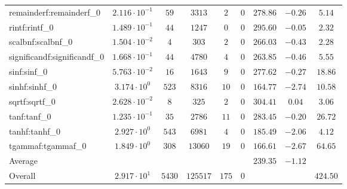 \begin{tabular}{|l|c|c|c|c|c|c|c|c|}
remainderf:remainderf\_0     & $ 2.116 \cdot 10^{-1} $ & $ 59     $ & $ 3313   $ & $ 2   $ & $ 0   $ & $ 278.86      $ & $ -0.26   $ & $ 5.14    $ \\
rintf:rintf\_0               & $ 1.489 \cdot 10^{-1} $ & $ 44     $ & $ 1247   $ & $ 0   $ & $ 0   $ & $ 295.60      $ & $ -0.05   $ & $ 2.32    $ \\
scalbnf:scalbnf\_0           & $ 1.504 \cdot 10^{-2} $ & $ 4      $ & $ 303    $ & $ 2   $ & $ 0   $ & $ 266.03      $ & $ -0.43   $ & $ 2.28    $ \\
significandf:significandf\_0 & $ 1.668 \cdot 10^{-1} $ & $ 44     $ & $ 4780   $ & $ 4   $ & $ 0   $ & $ 263.85      $ & $ -0.46   $ & $ 5.55    $ \\
sinf:sinf\_0                 & $ 5.763 \cdot 10^{-2} $ & $ 16     $ & $ 1643   $ & $ 9   $ & $ 0   $ & $ 277.62      $ & $ -0.27   $ & $ 18.86   $ \\
sinhf:sinhf\_0               & $ 3.174 \cdot 10^{0}  $ & $ 523    $ & $ 8316   $ & $ 10  $ & $ 0   $ & $ 164.77      $ & $ -2.74   $ & $ 10.58   $ \\
sqrtf:sqrtf\_0               & $ 2.628 \cdot 10^{-2} $ & $ 8      $ & $ 325    $ & $ 2   $ & $ 0   $ & $ 304.41      $ & $ 0.04    $ & $ 3.06    $ \\
tanf:tanf\_0                 & $ 1.235 \cdot 10^{-1} $ & $ 35     $ & $ 2786   $ & $ 11  $ & $ 0   $ & $ 283.45      $ & $ -0.20   $ & $ 26.72   $ \\
tanhf:tanhf\_0               & $ 2.927 \cdot 10^{0}  $ & $ 543    $ & $ 6981   $ & $ 4   $ & $ 0   $ & $ 185.49      $ & $ -2.06   $ & $ 4.12    $ \\
tgammaf:tgammaf\_0           & $ 1.849 \cdot 10^{0}  $ & $ 308    $ & $ 13060  $ & $ 19  $ & $ 0   $ & $ 166.61      $ & $ -2.67   $ & $ 64.65   $ \\
\hline
Average                      & $                     $ & $        $ & $        $ & $     $ & $     $ & $ 239.35      $ & $ -1.12   $ & $         $ \\
\hline
Overall                      & $ 2.917 \cdot 10^{1}  $ & $ 5430   $ & $ 125517 $ & $ 175 $ & $ 0   $ & $             $ & $         $ & $ 424.50  $ \\
\hline
\end{tabular}

